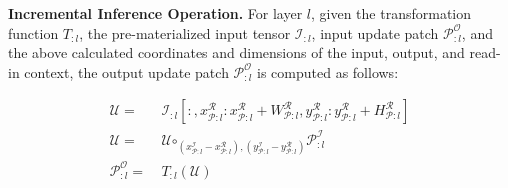 \begin{table}[t]
  \centering
\caption{Additional notation for Sections~\ref{sec:exact} and~\ref{sec:approx}.}
\label{table:optimizer_symbols}
\vspace{-4mm}
\end{table}

\vspace{2mm}
\noindent \textbf{Incremental Inference Operation.}
For layer $l$, given the transformation function $T_{:l}$, the pre-materialized input tensor $\mathcal{I}_{:l}$, input update patch $\mathcal{P}^\mathcal{O}_{:l}$, and the above calculated coordinates and dimensions of the input, output, and read-in context, the output update patch $\mathcal{P}^\mathcal{O}_{:l}$ is computed as follows:

\vspace{-2mm}
\begin{align}
\label{eqn:readin}
\mathcal{U} =&~ \mathcal{I}_{:l}[:,x^\mathcal{R}_{\mathcal{P}:l}:x^\mathcal{R}_{\mathcal{P}:l}+W^\mathcal{R}_{\mathcal{P}:l}, y^\mathcal{R}_{\mathcal{P}:l}: y^\mathcal{R}_{\mathcal{P}:l}+ H^\mathcal{R}_{\mathcal{P}:l}]\\
\label{eqn:superposition}
\mathcal{U} =&~ \mathcal{U} \bm\circ_{(x^\mathcal{I}_{\mathcal{P}:l}-x^\mathcal{R}_{\mathcal{P}:l}),(y^\mathcal{I}_{\mathcal{P}:l}-y^\mathcal{R}_{\mathcal{P}:l})} \mathcal{P}^{\mathcal{I}}_{:l}\\
\label{eqn:callt}
\mathcal{P}^\mathcal{O}_{:l} =&~ T_{:l}(\mathcal{U})
\end{align}

